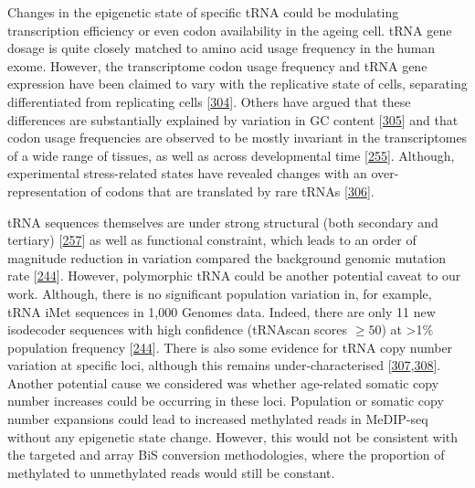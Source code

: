 \documentclass[
]{book}
\begin{document}
Changes in the epigenetic state of specific tRNA could be modulating transcription efficiency or even codon availability in the ageing cell.
tRNA gene dosage is quite closely matched to amino acid usage frequency in the human exome.
However, the transcriptome codon usage frequency and tRNA gene expression have been claimed to vary with the replicative state of cells, separating differentiated from replicating cells {[}\protect\hyperlink{ref-Gingold2014}{304}{]}.
Others have argued that these differences are substantially explained by variation in GC content {[}\protect\hyperlink{ref-Rudolph2016}{305}{]} and that codon usage frequencies are observed to be mostly invariant in the transcriptomes of a wide range of tissues, as well as across developmental time {[}\protect\hyperlink{ref-Schmitt2014}{255}{]}.
Although, experimental stress-related states have revealed changes with an over-representation of codons that are translated by rare tRNAs {[}\protect\hyperlink{ref-Gingold2012}{306}{]}.

tRNA sequences themselves are under strong structural (both secondary and tertiary) {[}\protect\hyperlink{ref-Goodenbour2006}{257}{]} as well as functional constraint, which leads to an order of magnitude reduction in variation compared the background genomic mutation rate {[}\protect\hyperlink{ref-Parisien2013}{244}{]}.
However, polymorphic tRNA could be another potential caveat to our work.
Although, there is no significant population variation in, for example, tRNA iMet sequences in 1,000 Genomes data.
Indeed, there are only 11 new isodecoder sequences with high confidence (tRNAscan scores \(\ge50\)) at \textgreater1\% population frequency {[}\protect\hyperlink{ref-Parisien2013}{244}{]}.
There is also some evidence for tRNA copy number variation at specific loci, although this remains under-characterised {[}\protect\hyperlink{ref-Iben2015}{307},\protect\hyperlink{ref-Darrow2014}{308}{]}.
Another potential cause we considered was whether age-related somatic copy number increases could be occurring in these loci.
Population or somatic copy number expansions could lead to increased methylated reads in MeDIP-seq without any epigenetic state change.
However, this would not be consistent with the targeted and array BiS conversion methodologies, where the proportion of methylated to unmethylated reads would still be constant.
\end{document}
